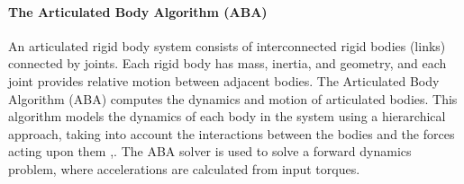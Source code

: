 \documentclass[report.tex]{subfiles}
\begin{document}
    \paragraph*{\large{The Articulated Body Algorithm (ABA)}\\ }
    An articulated rigid body system consists of interconnected rigid bodies (links) connected by joints. Each rigid body has mass, inertia, and geometry, and each joint provides relative motion between adjacent bodies.
    The Articulated Body Algorithm (ABA) computes the dynamics and motion of articulated bodies. This algorithm models the dynamics of each body in the system using a hierarchical approach, taking into account the interactions between the bodies and the forces acting upon them \cite{featherstone1983calculation},\cite{featherstone1999divide}. The ABA solver is used to solve a forward dynamics problem, where accelerations are calculated from input torques\cite{featherstone1999divide}. 
\end{document}
